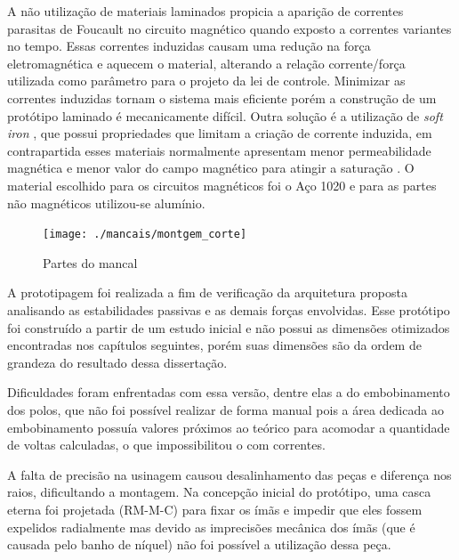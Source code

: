  
A não utilização de materiais laminados propicia  a aparição de correntes parasitas de Foucault no circuito magnético quando exposto a correntes variantes no tempo. Essas correntes induzidas  causam uma redução na força eletromagnética e aquecem o material, alterando a relação corrente/força utilizada como parâmetro para o projeto da lei de controle. Minimizar as correntes induzidas tornam o sistema mais eficiente porém a construção de um protótipo laminado é mecanicamente difícil. Outra solução é a utilização de \textit{soft iron} \citep{Boglietti2003}, que possui propriedades que limitam a criação de corrente induzida, em contrapartida esses materiais normalmente apresentam menor permeabilidade magnética e menor valor do campo magnético para atingir a saturação \citep{Han2013a}. O material escolhido para os circuitos magnéticos foi o Aço 1020 e para as partes não magnéticos utilizou-se alumínio.
  
\begin{figure}[th!]
\centering
\texttt{[image: ./mancais/montgem\_corte]}
\caption{Partes do mancal}
\label{fig:montgem:corte}
\end{figure} 

A prototipagem foi realizada a fim de verificação da arquitetura proposta analisando as estabilidades passivas e as demais forças envolvidas. Esse protótipo foi construído a partir de um estudo inicial e não possui as dimensões otimizados encontradas nos capítulos seguintes, porém suas dimensões são da ordem de grandeza do resultado dessa dissertação.

Dificuldades foram enfrentadas com essa versão, dentre elas a do embobinamento dos polos, que não foi possível realizar de forma manual pois a área dedicada ao embobinamento possuía valores próximos ao teórico para acomodar a quantidade de voltas calculadas, o que impossibilitou o com correntes.

A falta de precisão na usinagem causou desalinhamento das peças e diferença nos raios, dificultando a montagem. Na concepção inicial do protótipo, uma casca eterna foi projetada (RM-M-C) para fixar os ímãs e impedir que eles fossem expelidos radialmente mas devido as imprecisões mecânica dos ímãs (que é causada pelo banho de níquel) não foi possível a utilização dessa peça. 



